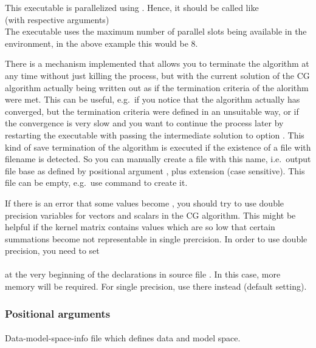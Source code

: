 This executable is parallelized using . Hence, it should be called like\\
 (with respective arguments)\\
The executable uses the maximum number of parallel slots being available in the  environment, in 
the above example this would be 8.

There is a mechanism implemented that allows you to terminate the algorithm at any time without just killing
the process, but with the current solution of the CG algorithm actually being written out as if the termination
criteria of the alorithm were met. 
This can be useful, e.g.\ if you notice that the algorithm actually has converged, but the termination
criteria were defined in an unsuitable way, or if the convergence is very slow and you want to continue
the process later by restarting the executable with passing the intermediate solution to option . 
This kind of save termination of the algorithm is executed if the existence of a file with filename
 is detected. So you can manually create a file with this name, i.e.\ 
output file base as defined by positional argument , plus extension 
(case sensitive). This file can be empty, e.g.\ use command \lcode{touch} to create it.

If there is an error that some values become  , you should try to use double precision
variables for vectors and scalars in the CG algorithm. This might be 
helpful if the kernel matrix contains values which are so low that certain summations 
become not representable in single prercision.
In order to use double precision, you need to set\\
\\
at the very beginning of the declarations in source file  .
In this case, more memory will be required. For single precision, use \lcode{SIZE_REAL} there instead (default
setting).
\subsubsection{Positional arguments}
\paragraph{}
Data-model-space-info file which defines data and model space.
